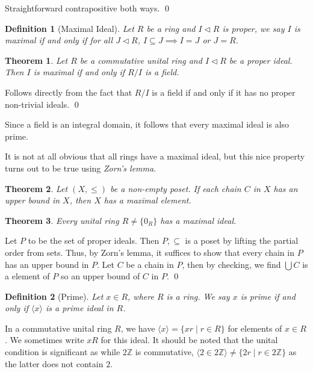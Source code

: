 \documentclass[
]{article}
\newtheorem{theorem}{Theorem}
\newtheorem{definition}{Definition}[theorem]
\begin{document}
Straightforward contrapositive both ways. \qed

\begin{definition}[Maximal Ideal]
  Let \(R\) be a ring and \(I \triangleleft R\) is proper, we say \(I\) is 
  maximal if and only if for all \(J \triangleleft R\), 
  \(I \subseteq J \implies I = J\) or \(J = R\).
\end{definition}

\begin{theorem}
  Let \(R\) be a commutative unital ring and \(I \triangleleft R\) be a proper 
  ideal. Then \(I\) is maximal if and only if \(R / I\) is a field.
\end{theorem}
\proof

Follows directly from the fact that \(R / I\) is a field if and only if
it has no proper non-trivial ideals. \qed

Since a field is an integral domain, it follows that every maximal ideal
is also prime.

It is not at all obvious that all rings have a maximal ideal, but this
nice property turns out to be true using \emph{Zorn's lemma}.

\begin{theorem}
  Let \((X, \le)\) be a non-empty poset. If each chain \(C\) in \(X\) has an 
  upper bound in \(X\), then \(X\) has a maximal element.
\end{theorem}

\begin{theorem}
  Every unital ring \(R \neq \{0_R\}\) has a maximal ideal.
\end{theorem}
\proof

Let \(P\) to be the set of proper ideals. Then \(P, \subseteq\) is a
poset by lifting the partial order from sets. Thus, by Zorn's lemma, it
suffices to show that every chain in \(P\) has an upper bound in \(P\).
Let \(C\) be a chain in \(P\), then by checking, we find \(\bigcup C\)
is a element of \(P\) so an upper bound of \(C\) in \(P\). \qed

\begin{definition}[Prime]
  Let \(x \in R\), where \(R\) is a ring. We say \(x\) is \textit{prime} if and 
  only if \(\langle x \rangle\) is a prime ideal in \(R\).
\end{definition}

In a commutative unital ring \(R\), we have
\(\langle x \rangle = \{xr \mid r \in R\}\) for elements of \(x \in R\).
We sometimes write \(xR\) for this ideal. It should be noted that the
unital condition is significant as while \(2\mathbb{Z}\) is commutative,
\(\langle 2 \in 2\mathbb{Z} \rangle \neq \{2r \mid r \in 2\mathbb{Z}\}\)
as the latter does not contain \(2\).
\end{document}
